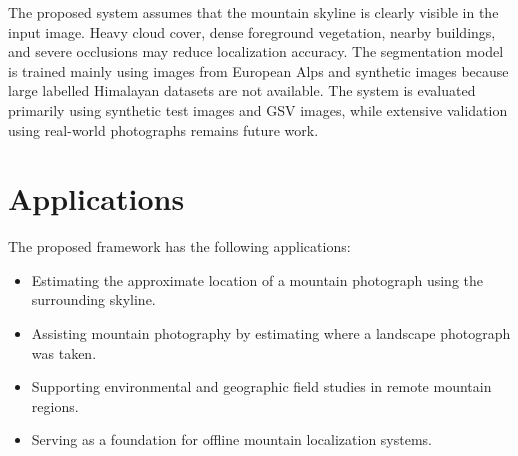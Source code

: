 The proposed system assumes that the mountain skyline is clearly visible in the input image. Heavy cloud cover, dense foreground vegetation, nearby buildings, and severe occlusions may reduce localization accuracy. The segmentation model is trained mainly using images from European Alps and synthetic images because large labelled Himalayan datasets are not available. The system is evaluated primarily using synthetic test images and GSV images, while extensive validation using real-world photographs remains future work.

\section{Applications}

The proposed framework has the following applications:

\begin{itemize}
    \item Estimating the approximate location of a mountain photograph using the surrounding skyline.
    \item Assisting mountain photography by estimating where a landscape photograph was taken.
    \item Supporting environmental and geographic field studies in remote mountain regions.
    \item Serving as a foundation for offline mountain localization systems.
\end{itemize}
